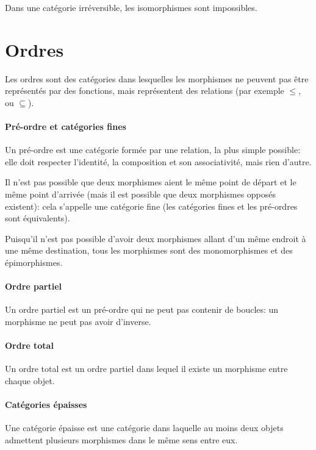 \documentclass[a4paper,10pt,french,openany]{memoir}
\begin{document}
Dans une catégorie irréversible, les isomorphismes sont impossibles.

\section{Ordres}

Les ordres sont des catégories dans lesquelles les morphismes ne peuvent pas être représentés par des fonctions, mais représentent des relations (par exemple $\leq$, ou $\subseteq$).

\paragraph{Pré-ordre et catégories fines}
Un pré-ordre est une catégorie formée par une relation, la plus simple possible: elle doit respecter l'identité, la composition et son associativité, mais rien d'autre.

Il n'est pas possible que deux morphismes aient le même point de départ et le même point d'arrivée (mais il est possible que deux morphismes opposés existent): cela s'appelle une catégorie fine (les catégories fines et les pré-ordres sont équivalents).

Puisqu'il n'est pas possible d'avoir deux morphismes allant d'un même endroit à une même destination, tous les morphismes sont des monomorphismes et des épimorphismes.

\paragraph{Ordre partiel}
Un ordre partiel est un pré-ordre qui ne peut pas contenir de boucles: un morphisme ne peut pas avoir d'inverse.

\paragraph{Ordre total}
Un ordre total est un ordre partiel dans lequel il existe un morphisme entre chaque objet.

\paragraph{Catégories épaisses}
Une catégorie épaisse est une catégorie dans laquelle au moins deux objets admettent plusieurs morphismes dans le même sens entre eux.
\end{document}
